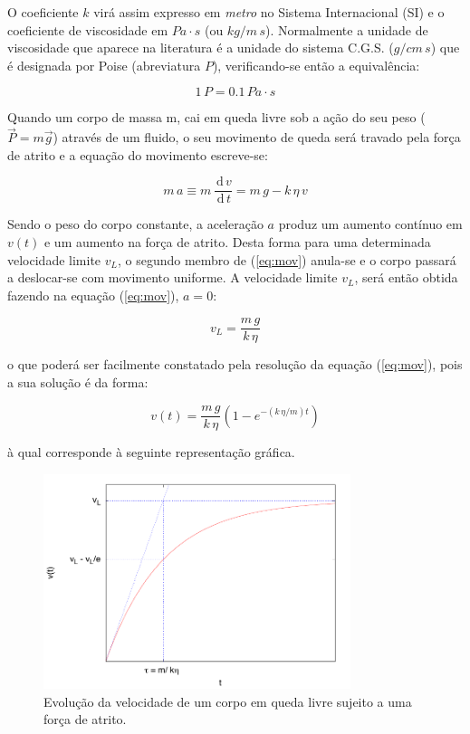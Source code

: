 \documentclass[a4paper,twoside,12pt]{article}      %
\newcommand{\ud}{\,\mathrm{d}}
\begin{document}
\begin{multicols}{2}
O coeficiente $k$ virá assim expresso em \emph{metro} no Sistema Internacional (SI) e o coeficiente de viscosidade em $Pa\cdot s$ (ou $kg/m\,s$).
Normalmente a unidade de viscosidade que aparece na literatura é a unidade do sistema C.G.S. ($g/cm\,s$) que é designada por Poise (abreviatura $P$), verificando-se então a equivalência:

\begin{equation*}
	1 \, P = 0.1\, Pa\cdot s
\end{equation*}

Quando um corpo de massa m, cai em queda livre sob a ação do seu peso ($\vec{P}=m\vec{g}$) através de um fluido, o seu movimento de queda será travado pela força de atrito e a equação do movimento escreve-se:

\begin{equation}
	\label{eq:mov}
	m\,a \equiv m\, \frac{\ud\, v}{\ud\, t} =  m\,g - k  \, \eta \, v
\end{equation}

Sendo o peso do corpo constante, a aceleração $a$ produz um aumento contínuo em $v(t)$ e um aumento na força de atrito. Desta forma para uma determinada velocidade limite $v_L$, o segundo membro de (\ref{eq:mov}) anula-se e o corpo passará a deslocar-se com movimento uniforme. A velocidade limite $v_L$, será então obtida fazendo na equação (\ref{eq:mov}), $a= 0$:

\begin{equation}
	\label{eq:vlimit}
	v_L = \frac{m\,g}{k  \, \eta}
\end{equation}

o que poderá ser facilmente constatado pela resolução da equação (\ref{eq:mov}), pois a sua solução é da forma:

\begin{equation}
	\label{eq:vlimita}
	v(t) = \frac{m\,g}{k  \, \eta} (1 - e^{- (k\,\eta / m) t})
\end{equation}

à qual corresponde à seguinte representação gráfica.

\end{multicols}

\begin{figure}
	[tb]  \centering 
	\includegraphics[width=0.8\textwidth]{./plote}
	\caption{ Evolução da velocidade de um corpo em queda livre sujeito a uma força de atrito. \label{fig:vLim}} 
\end{figure}
\end{document}
